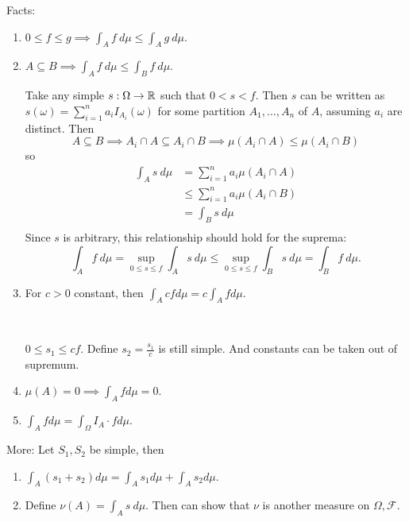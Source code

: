 \documentclass[class=article,crop=false]{standalone}
\begin{document}
Facts:
\begin{enumerate}[label=\arabic*)]
	\item $ 0\leq f \leq g \implies \int_A f \  d \mu \leq \int_A g\ d \mu$.
	\item $ A \subseteq B \implies \int_A f\ d \mu \leq \int_B f\ d \mu$.
		\begin{prf}
			Take any simple $s: \Omega \to \mathbb{R} $ such that $ 0<s<f$. Then $ s$ can be written as  $ s(\omega)=\sum_{ i= 1}^{ n} a_i I_{A_i} (\omega)$  for some partition $ A_1, \ldots, A_n$ of $ A$, assuming $ a_i$ are distinct. Then
			\[
				A \subseteq B \implies A_i \cap A \subseteq A_i \cap B \implies \mu(A_i \cap A) \leq \mu(A_i \cap B)
			\] 
			so
			\begin{align*}
				\int_A s\ d \mu&= \sum_{ i= 1}^{ n} a_i \mu(A_i \cap A) \\
					      &\leq \sum_{ i= 1}^{ n} a_i \mu(A_i \cap B)  \\
					      &= \int_B s\ d \mu \\
			\end{align*}
			Since $ s$ is arbitrary, this relationship should hold for the suprema:
			 \[
			\int_A f \ d \mu = \sup_{0\leq s \leq f} \int_A s \ d \mu \leq \sup_{0\leq s\leq f} \int_B s \ d \mu = \int_B f \ d \mu 
			.\] 
		\end{prf}
	\item For $ c>0$ constant, then  $ \int_A cf d \mu = c \int_A f d \mu$.

		~\begin{prf}
		$ 0\leq s_1 \leq c f$. Define $ s_2 = \frac{s_1}{c }$ is still simple. And constants can be taken out of supremum.
		\end{prf}
	\item $ \mu(A)=0 \implies \int_A f d \mu=0$.
	\item $ \int_A f d \mu = \int_\Omega I_A \cdot  f d \mu$.
\end{enumerate}

More: Let $ S_1,S_2$ be simple, then
\begin{enumerate}[label=\arabic*)]
	\item $ \int_A (s_1 + s_2) d \mu = \int_A s_1 d \mu + \int_A s_2 d \mu$.
	\item Define $ \nu (A) = \int_A s\ d \mu$. Then can show that $ \nu$ is another measure on  $ \Omega,\mathcal{F}$.
\end{enumerate}
\end{document}
